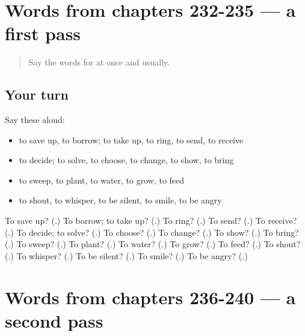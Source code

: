 \section[(dialogue)]{Words from chapters 232-235 — a first pass}

\label{lesson:RU-R240-first-pass-words-from-chapters-232-235}



\begin{quote}
Say the words for at once and usually.
\end{quote}

\subsection*{Your turn}
Say these aloud:

\begin{itemize}
\raggedright
  \item to save up, to borrow; to take up, to ring, to send, to receive
  \item to decide; to solve, to choose, to change, to show, to bring
  \item to sweep, to plant, to water, to grow, to feed
  \item to shout, to whisper, to be silent, to smile, to be angry
\end{itemize}

\begin{tcolorbox}[breakable,colback=teal!4,colframe=teal!35!black,title={Before you move on}]
To save up? (\textbf{}.) To borrow; to take up? (\textbf{}.) To ring? (\textbf{}.) To send? (\textbf{}.) To receive? (\textbf{}.) To decide; to solve? (\textbf{}.) To choose? (\textbf{}.) To change? (\textbf{}.) To show? (\textbf{}.) To bring? (\textbf{}.) To sweep? (\textbf{}.) To plant? (\textbf{}.) To water? (\textbf{}.) To grow? (\textbf{}.) To feed? (\textbf{}.) To shout? (\textbf{}.) To whisper? (\textbf{}.) To be silent? (\textbf{}.) To smile? (\textbf{}.) To be angry? (\textbf{}.)
\end{tcolorbox}
\section[(dialogue)]{Words from chapters 236-240 — a second pass}

